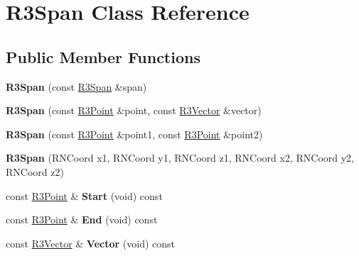 \hypertarget{class_r3_span}{}\section{R3\+Span Class Reference}
\label{class_r3_span}
\subsection*{Public Member Functions}
\begin{DoxyCompactItemize}
\item 
{\bfseries R3\+Span} (const \hyperlink{class_r3_span}{R3\+Span} \&span)\hypertarget{class_r3_span_af6722e4e0ca2b88613df50c0dccf495b}{}\label{class_r3_span_af6722e4e0ca2b88613df50c0dccf495b}

\item 
{\bfseries R3\+Span} (const \hyperlink{class_r3_point}{R3\+Point} \&point, const \hyperlink{class_r3_vector}{R3\+Vector} \&vector)\hypertarget{class_r3_span_a397f095aab62259ea85b4edb1a093806}{}\label{class_r3_span_a397f095aab62259ea85b4edb1a093806}

\item 
{\bfseries R3\+Span} (const \hyperlink{class_r3_point}{R3\+Point} \&point1, const \hyperlink{class_r3_point}{R3\+Point} \&point2)\hypertarget{class_r3_span_a31c0a79aefec3f5d1519fa4bec2422ce}{}\label{class_r3_span_a31c0a79aefec3f5d1519fa4bec2422ce}

\item 
{\bfseries R3\+Span} (R\+N\+Coord x1, R\+N\+Coord y1, R\+N\+Coord z1, R\+N\+Coord x2, R\+N\+Coord y2, R\+N\+Coord z2)\hypertarget{class_r3_span_a345ce02263964218a7e1d647ab521321}{}\label{class_r3_span_a345ce02263964218a7e1d647ab521321}

\item 
const \hyperlink{class_r3_point}{R3\+Point} \& {\bfseries Start} (void) const \hypertarget{class_r3_span_ac1f284804b7664f76c5b6f3d7b485551}{}\label{class_r3_span_ac1f284804b7664f76c5b6f3d7b485551}

\item 
const \hyperlink{class_r3_point}{R3\+Point} \& {\bfseries End} (void) const \hypertarget{class_r3_span_a7f2199b61961212eb950c9f28abe28bf}{}\label{class_r3_span_a7f2199b61961212eb950c9f28abe28bf}

\item 
const \hyperlink{class_r3_vector}{R3\+Vector} \& {\bfseries Vector} (void) const \hypertarget{class_r3_span_a5bfd6969ef381b3809a01ef7f055ad29}{}\label{class_r3_span_a5bfd6969ef381b3809a01ef7f055ad29}


\end{DoxyCompactItemize}
